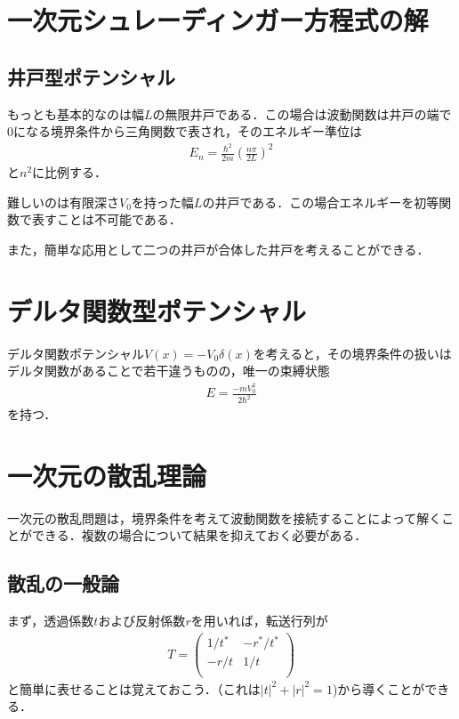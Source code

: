 \documentclass[a4j]{jarticle}
\begin{document}
\section{一次元シュレーディンガー方程式の解}
\subsection{井戸型ポテンシャル}
もっとも基本的なのは幅$L$の無限井戸である．この場合は波動関数は井戸の端で$0$になる境界条件から三角関数で表され，そのエネルギー準位は
\begin{align*}
 E_n=\frac{\hbar^2}{2m}\left(\frac{n\pi}{2L}\right)^2
\end{align*}
と$n^2$に比例する．

難しいのは有限深さ$V_0$を持った幅$L$の井戸である．この場合エネルギーを初等関数で表すことは不可能である．



また，簡単な応用として二つの井戸が合体した井戸を考えることができる．


\section{デルタ関数型ポテンシャル}
デルタ関数ポテンシャル$V(x)=-V_0\delta (x)$を考えると，その境界条件の扱いはデルタ関数があることで若干違うものの，唯一の束縛状態
\begin{align*}
 E=\frac{-mV_0^2}{2\hbar^2}
\end{align*}
を持つ．


\section{一次元の散乱理論}
一次元の散乱問題は，境界条件を考えて波動関数を接続することによって解くことができる．複数の場合について結果を抑えておく必要がある．

\subsection{散乱の一般論}
まず，透過係数$t$および反射係数$r$を用いれば，転送行列が
\begin{align*}
 T=\left(
  \begin{array}{cc}
   1/t^*&-r^*/t^* \\
   -r/t& 1/t\\
  \end{array}
 \right)
\end{align*}
と簡単に表せることは覚えておこう．（これは$|t|^2+|r|^2=1$)から導くことができる．
\end{document}

